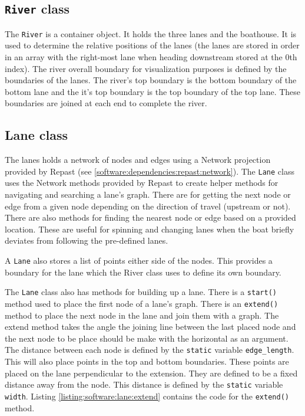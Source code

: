 \subsection{\texttt{River} class}
The \texttt{River} is a container object. It holds the three lanes and the
boathouse. It is used to determine the relative positions of the lanes
(the lanes are stored in order in an array with the right-most lane when
heading downstream stored at the 0th index). The river overall
boundary for visualization purposes is defined by the boundaries of
the lanes. The river's top boundary is the bottom boundary of
the bottom lane and the it's top boundary is the top boundary
of the top lane. These boundaries are joined at each end to
complete the river.

\subsection{Lane class}

The lanes holds a network of nodes and edges using a Network
projection provided by Repast (see
\ref{software:dependencies:repast:network}). The \texttt{Lane} class uses the
Network methods provided by Repast to create helper methods for
navigating and searching a lane's graph. There are for getting the
next node or edge from a given node depending on the direction of
travel (upstream or not). There are also methods for finding the
nearest node or edge based on a provided location. These are useful
for spinning and changing lanes when the boat briefly deviates from
following the pre-defined lanes.

A \texttt{Lane} also stores a list of points either side of the nodes. This
provides a boundary for the lane which the River class uses to define
its own boundary.

The \texttt{Lane} class also has methods for building up a lane. There is a
\texttt{start()} method used to place the first node of a lane's
graph. There is an \texttt{extend()} method to place the next node in
the lane and join them with a graph. The extend method takes the angle
the joining line between the last placed node and the next node to be
place should be make with the horizontal as an argument. The distance
between each node is defined by the \texttt{static} variable
\texttt{edge\_length}. This will also place points in the top and
bottom boundaries. These points are placed on the lane perpendicular
to the extension. They are defined to be a fixed distance away from
the node. This distance is defined by the \texttt{static} variable
\texttt{width}. Listing \ref{listing:software:lane:extend} contains the code for the \texttt{extend()} method.

